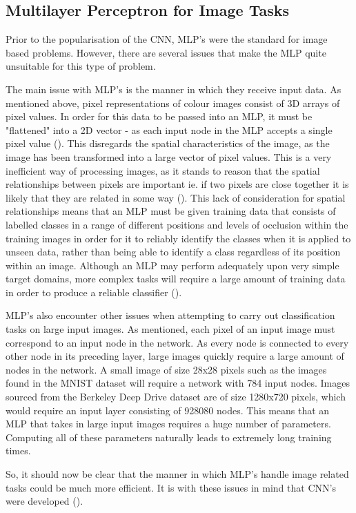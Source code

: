 \documentclass[12pt]{report}
\begin{document}
\subsection{Multilayer Perceptron for Image Tasks}
\begin{flushleft}
Prior to the popularisation of the CNN, MLP's were the standard for image based problems. However, there are several issues that make the MLP quite unsuitable for this type of problem.

\vspace{0.5cm}
The main issue with MLP's is the manner in which they receive input data. As mentioned above, pixel representations of colour images consist of 3D arrays of pixel values. In order for this data to be passed into an MLP, it must be "flattened" into a 2D vector - as each input node in the MLP accepts a single pixel value (\cite{ben1999fast}). This disregards the spatial characteristics of the image, as the image has been transformed into a large vector of pixel values. This is a very inefficient way of processing images, as it stands to reason that the spatial relationships between pixels are important ie. if two pixels are close together it is likely that they are related in some way (\cite{lecun1989backpropagation}). This lack of consideration for spatial relationships means that an MLP must be given training data that consists of labelled classes in a range of different positions and levels of occlusion within the training images in order for it to reliably identify the classes when it is applied to unseen data, rather than being able to identify a class regardless of its position within an image. Although an MLP may perform adequately upon very simple target domains, more complex tasks will require a large amount of training data in order to produce a reliable classifier (\cite{ghaith}).

\vspace{0.5cm}
MLP's also encounter other issues when attempting to carry out classification tasks on large input images. As mentioned, each pixel of an input image must correspond to an input node in the network. As every node is connected to every other node in its preceding layer, large images quickly require a large amount of nodes in the network. A small image of size 28x28 pixels such as the images found in the MNIST dataset will require a network with 784 input nodes. Images sourced from the Berkeley Deep Drive dataset are of size 1280x720 pixels, which would require an input layer consisting of 928080 nodes. This means that an MLP that takes in large input images requires a huge number of parameters. Computing all of these parameters naturally leads to extremely long training times.

\vspace{0.5cm}
So, it should now be clear that the manner in which MLP's handle image related tasks could be much more efficient. It is with these issues in mind that CNN's were developed (\cite{lecun1989backpropagation}).
\end{flushleft}
\end{document}
